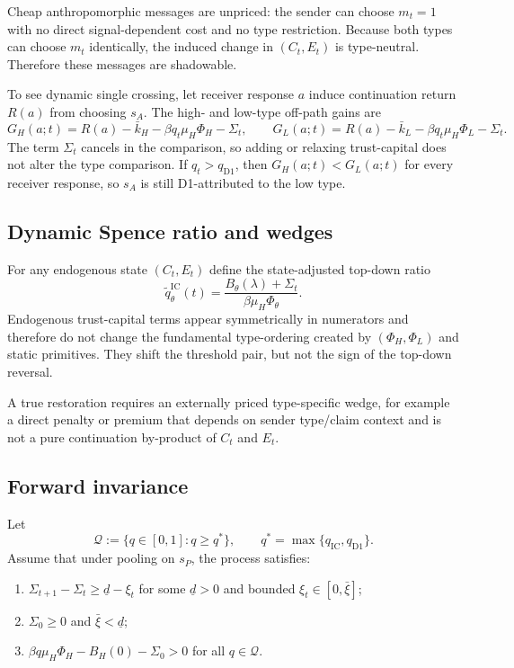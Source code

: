 Cheap anthropomorphic messages are unpriced: the sender can choose $m_t=1$ with no direct signal-dependent cost and no type restriction. Because both types can choose $m_t$ identically, the induced change in $(C_t,E_t)$ is type-neutral. Therefore these messages are shadowable.

To see dynamic single crossing, let receiver response $a$ induce continuation return $R(a)$ from choosing $s_A$. The high- and low-type off-path gains are
\[
G_H(a;t)=R(a)-\bar k_H-\beta q_t\mu_H\Phi_H-\Sigma_t,
\qquad
G_L(a;t)=R(a)-\bar k_L-\beta q_t\mu_H\Phi_L-\Sigma_t.
\]
The term $\Sigma_t$ cancels in the comparison, so adding or relaxing trust-capital does not alter the type comparison. If $q_t>q_{\mathrm{D1}}$, then $G_H(a;t)<G_L(a;t)$ for every receiver response, so $s_A$ is still D1-attributed to the low type.

\subsection{Dynamic Spence ratio and wedges}

For any endogenous state $(C_t,E_t)$ define the state-adjusted top-down ratio
\[
\widetilde q^{\mathrm{IC}}_\theta(t)=\frac{B_\theta(\lambda)+\Sigma_t}{\beta\mu_H\Phi_\theta}.
\]
Endogenous trust-capital terms appear symmetrically in numerators and therefore do not change the fundamental type-ordering created by $(\Phi_H,\Phi_L)$ and static primitives. They shift the threshold pair, but not the sign of the top-down reversal.

A true restoration requires an externally priced type-specific wedge, for example a direct penalty or premium that depends on sender type/claim context and is not a pure continuation by-product of $C_t$ and $E_t$.

\subsection{Forward invariance}

Let
\[
\mathcal Q:=\{q\in[0,1]: q\ge q^*\},
\qquad q^*=\max\{q_{\mathrm{IC}},q_{\mathrm{D1}}\}.
\]
Assume that under pooling on $s_P$, the process satisfies:
\begin{enumerate}
\item $\Sigma_{t+1}-\Sigma_t\ge \underline d-\xi_t$ for some $\underline d>0$ and bounded $\xi_t\in[0,\bar\xi]$;
\item $\Sigma_0\ge 0$ and $\bar\xi<\underline d$;
\item $\beta q\mu_H\Phi_H-B_H(0)-\Sigma_0>0$ for all $q\in\mathcal Q$.
\end{enumerate}

